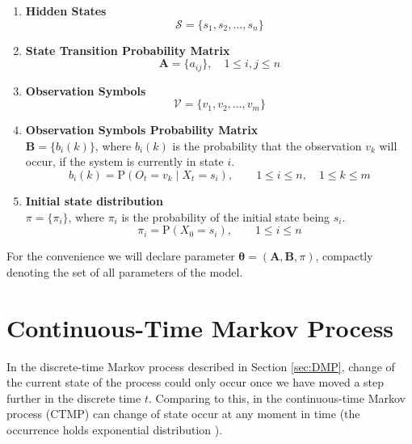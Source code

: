 \documentclass[thesis=M,english]{FITthesis}[2012/10/20]
\newcommand{\matr}[1]{\mathbf{#1}}
\begin{document}
\begin{enumerate}[resume]
\setcounter{enumi}{0}
\item \textbf{Hidden States}
\begin{equation}
\mathcal{S} = \{ s_1,s_2, \dots, s_n \}
\end{equation} 
\item \textbf{State Transition Probability Matrix}
\begin{equation}\label{eq:tp}
\matr{A} = \{ a_{ij} \}, \quad 1 \leq i,j \leq n
\end{equation} 
\item \textbf{Observation Symbols}
\begin{equation}
\mathcal{V} = \{ v_1,v_2, \dots, v_m \} 
\end{equation}
\item \textbf{Observation Symbols Probability Matrix} \\
$\matr{B} = \{ b_{i}(k) \}$, where $b_{i}(k)$ is the probability that the observation $v_k$ will occur, if the system is currently in state $i$. 
\begin{equation}
b_i(k) = \mathrm{P}( O_t = v_k  \mid X_t = s_i), \qquad 1 \leq i \leq n, \quad 1 \leq k \leq m
\end{equation}
\item \textbf{Initial state distribution} \\
$\pi = \{ \pi_i \}$, where $\pi_i$ is the probability of the initial state being $s_i$.
\begin{equation}
\pi_{i} = \mathrm{P}(X_0 = s_i), \qquad 1 \leq i \leq n
\end{equation}
\end{enumerate}

For the convenience we will declare parameter $\matr{\theta} = (\matr{A},\matr{B},\pi)$, compactly denoting the set of all parameters of the model. 

\section{Continuous-Time Markov Process}\label{sec:ctmp}

In the discrete-time Markov process described in Section \ref{sec:DMP}, change of the current state of the process could only occur once we have moved a step further in the discrete time $t$. Comparing to this, in the continuous-time Markov process (CTMP) can change of state occur at any moment in time (the occurrence holds exponential distribution ).
\end{document}
